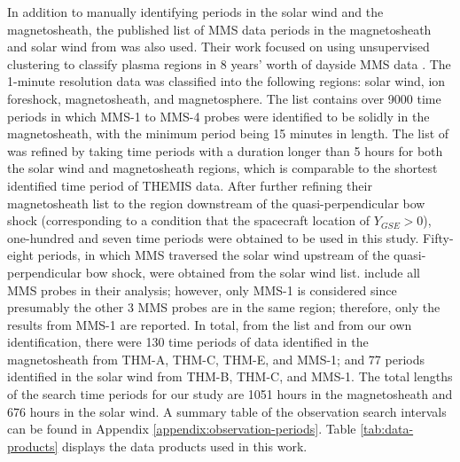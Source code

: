 In addition to manually identifying periods in the solar wind and the magnetosheath, the published list of MMS data periods in the magnetosheath and solar wind from \cite{ToyEdens:2024} was also used. Their work focused on using unsupervised clustering to classify plasma regions in 8 years' worth of dayside MMS data \citep{ToyEdens2:2024}. The 1-minute resolution data was classified into the following regions: solar wind, ion foreshock, magnetosheath, and magnetosphere. The \cite{ToyEdens:2024} list contains over 9000 time periods in which MMS-1 to MMS-4 probes were identified to be solidly in the magnetosheath, with the minimum period being 15 minutes in length. The list of \cite{ToyEdens:2024} was refined by taking time periods with a duration longer than 5 hours for both the solar wind and magnetosheath regions, which is comparable to the shortest identified time period of THEMIS data. After further refining their magnetosheath list to the region downstream of the quasi-perpendicular bow shock (corresponding to a condition that the spacecraft location of $Y_{GSE}>0$), one-hundred and seven time periods were obtained to be used in this study. Fifty-eight periods, in which MMS traversed the solar wind upstream of the quasi-perpendicular bow shock, were obtained from the \cite{ToyEdens:2024} solar wind list. \cite{ToyEdens2:2024} include all MMS probes in their analysis; however, only MMS-1 is considered since presumably the other 3 MMS probes are in the same region; therefore, only the results from MMS-1 are reported. In total, from the \cite{ToyEdens:2024} list and from our own identification, there were 130 time periods of data identified in the magnetosheath from THM-A, THM-C, THM-E, and MMS-1; and 77 periods identified in the solar wind from THM-B, THM-C, and MMS-1. The total lengths of the search time periods for our study are 1051 hours in the magnetosheath and 676 hours in the solar wind. A summary table of the observation search intervals can be found in Appendix \ref{appendix:observation-periods}. Table \ref{tab:data-products} displays the data products used in this work.



